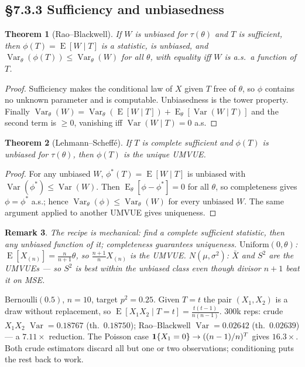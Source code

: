 \documentclass[11pt]{article}
\newtheorem{theorem}{Theorem}[section]
\newtheorem{remark}[theorem]{Remark}
\DeclareMathOperator{\Var}{Var}\DeclareMathOperator{\Cov}{Cov}\DeclareMathOperator{\E}{E}
\begin{document}
\subsection{\S7.3.3 Sufficiency and unbiasedness}
\begin{theorem}[Rao--Blackwell]
If $W$ is unbiased for $\tau(\theta)$ and $T$ is sufficient, then $\phi(T)=\E[W\mid T]$ is a statistic, is unbiased, and $\Var_\theta(\phi(T))\le\Var_\theta(W)$ for all $\theta$, with equality iff $W$ is a.s.\ a function of $T$.
\end{theorem}
\begin{proof}
Sufficiency makes the conditional law of $X$ given $T$ free of $\theta$, so $\phi$ contains no unknown parameter and is computable. Unbiasedness is the tower property. Finally $\Var_\theta(W)=\Var_\theta(\E[W\mid T])+\E_\theta[\Var(W\mid T)]$ and the second term is $\ge0$, vanishing iff $\Var(W\mid T)=0$ a.s.
\end{proof}
\begin{theorem}[Lehmann--Scheff\'e]
If $T$ is complete sufficient and $\phi(T)$ is unbiased for $\tau(\theta)$, then $\phi(T)$ is the unique UMVUE.
\end{theorem}
\begin{proof}
For any unbiased $W$, $\phi^*(T)=\E[W\mid T]$ is unbiased with $\Var(\phi^*)\le\Var(W)$. Then $\E_\theta[\phi-\phi^*]=0$ for all $\theta$, so completeness gives $\phi=\phi^*$ a.s.; hence $\Var_\theta(\phi)\le\Var_\theta(W)$ for every unbiased $W$. The same argument applied to another UMVUE gives uniqueness.
\end{proof}
\begin{remark}
The recipe is mechanical: find a complete sufficient statistic, then any unbiased function of it; completeness guarantees uniqueness. $\mathrm{Uniform}(0,\theta)$: $\E[X_{(n)}]=\frac n{n+1}\theta$, so $\frac{n+1}nX_{(n)}$ is the UMVUE. $N(\mu,\sigma^2)$: $\bar X$ and $S^2$ are the UMVUEs --- so $S^2$ is best \emph{within the unbiased class} even though divisor $n+1$ beat it on MSE.
\end{remark}
\begin{simbox}
Bernoulli$(0.5)$, $n=10$, target $p^2=0.25$. Given $T=t$ the pair $(X_1,X_2)$ is a draw without replacement, so $\E[X_1X_2\mid T=t]=\frac{t(t-1)}{n(n-1)}$. 300k reps: crude $X_1X_2$ $\Var=0.18767$ (th.\ $0.18750$); Rao--Blackwell $\Var=0.02642$ (th.\ $0.02639$) --- a $7.11\times$ reduction. The Poisson case $\mathbf 1\{X_1=0\}\to((n-1)/n)^T$ gives $16.3\times$. Both crude estimators discard all but one or two observations; conditioning puts the rest back to work.
\end{simbox}
\end{document}
